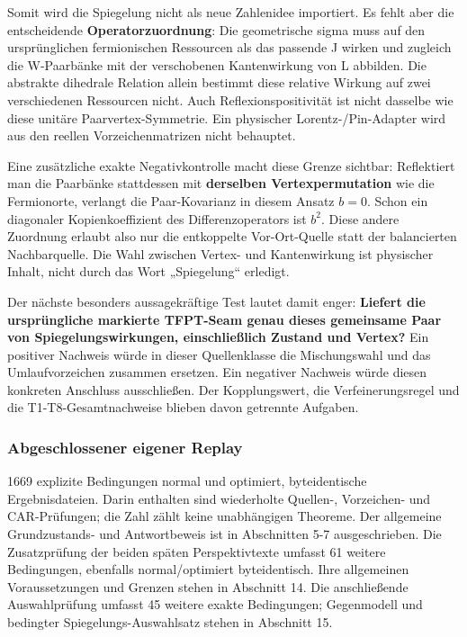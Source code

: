 Somit wird die Spiegelung nicht als neue Zahlenidee importiert. Es fehlt
aber die entscheidende \textbf{Operatorzuordnung}: Die geometrische
sigma muss auf den ursprünglichen fermionischen Ressourcen als das
passende J wirken und zugleich die W-Paarbänke mit der verschobenen
Kantenwirkung von L abbilden. Die abstrakte dihedrale Relation allein
bestimmt diese relative Wirkung auf zwei verschiedenen Ressourcen nicht.
Auch Reflexionspositivität ist nicht dasselbe wie diese unitäre
Paarvertex-Symmetrie. Ein physischer Lorentz-/Pin-Adapter wird aus den
reellen Vorzeichenmatrizen nicht behauptet.

Eine zusätzliche exakte Negativkontrolle macht diese Grenze sichtbar:
Reflektiert man die Paarbänke stattdessen mit \textbf{derselben
Vertexpermutation} wie die Fermionorte, verlangt die Paar-Kovarianz in
diesem Ansatz \(b=0\). Schon ein diagonaler Kopienkoeffizient des
Differenzoperators ist \(b^2\). Diese andere Zuordnung erlaubt also nur
die entkoppelte Vor-Ort-Quelle statt der balancierten Nachbarquelle. Die
Wahl zwischen Vertex- und Kantenwirkung ist physischer Inhalt, nicht
durch das Wort „Spiegelung`` erledigt.

Der nächste besonders aussagekräftige Test lautet damit enger:
\textbf{Liefert die ursprüngliche markierte TFPT-Seam genau dieses
gemeinsame Paar von Spiegelungswirkungen, einschließlich Zustand und
Vertex?} Ein positiver Nachweis würde in dieser Quellenklasse die
Mischungswahl und das Umlaufvorzeichen zusammen ersetzen. Ein negativer
Nachweis würde diesen konkreten Anschluss ausschließen. Der
Kopplungswert, die Verfeinerungsregel und die T1-T8-Gesamtnachweise
blieben davon getrennte Aufgaben.

\subsubsection{Abgeschlossener eigener
Replay}\label{abgeschlossener-eigener-replay}

1669 explizite Bedingungen normal und optimiert, byteidentische
Ergebnisdateien. Darin enthalten sind wiederholte Quellen-, Vorzeichen-
und CAR-Prüfungen; die Zahl zählt keine unabhängigen Theoreme. Der
allgemeine Grundzustands- und Antwortbeweis ist in Abschnitten 5-7
ausgeschrieben. Die Zusatzprüfung der beiden späten Perspektivtexte
umfasst 61 weitere Bedingungen, ebenfalls normal/optimiert
byteidentisch. Ihre allgemeinen Voraussetzungen und Grenzen stehen in
Abschnitt 14. Die anschließende Auswahlprüfung umfasst 45 weitere exakte
Bedingungen; Gegenmodell und bedingter Spiegelungs-Auswahlsatz stehen in
Abschnitt 15.

\newpage

